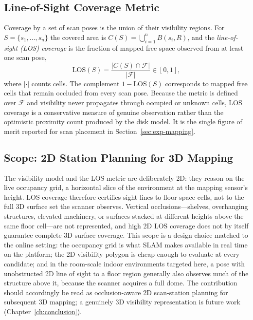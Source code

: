 \subsection{Line-of-Sight Coverage Metric}
\label{subsec:los}

Coverage by a set of scan poses is the union of their visibility regions. For
$S=\{s_1,\dots,s_n\}$ the covered area is $C(S)=\bigcup_{i=1}^{n} B(s_i,R)$,
and the \emph{line-of-sight (LOS) coverage} is the fraction of mapped free
space observed from at least one scan pose,
\begin{equation}
\mathrm{LOS}(S)=\frac{\lvert C(S)\cap\mathcal{F}\rvert}{\lvert\mathcal{F}\rvert}\in[0,1],
\label{eq:los}
\end{equation}
where $\lvert\cdot\rvert$ counts cells. The complement $1-\mathrm{LOS}(S)$
corresponds to mapped free cells that remain occluded from every scan pose.
Because the metric is defined over $\mathcal{F}$ and visibility never
propagates through occupied or unknown cells, LOS coverage is a conservative
measure of genuine observation rather than the optimistic proximity count
produced by the disk model. It is the single figure of merit reported for
scan placement in Section~\ref{sec:exp-mapping}.

\subsection{Scope: 2D Station Planning for 3D Mapping}
\label{subsec:scope2d}

The visibility model and the LOS metric are deliberately 2D: they
reason on the live occupancy grid, a horizontal slice of the environment at the
mapping sensor's height. LOS coverage therefore certifies sight lines to
floor-space cells, not to the full 3D surface set the scanner observes.
Vertical occlusions---shelves, overhanging structures, elevated machinery, or
surfaces stacked at different heights above the same floor cell---are not
represented, and high 2D LOS coverage does not by itself guarantee complete 3D
surface coverage. This scope is a design choice matched to the online setting:
the occupancy grid is what SLAM makes available in real time on the platform;
the 2D visibility polygon is cheap enough to evaluate at every candidate; and
in the room-scale indoor environments targeted here, a pose with unobstructed
2D line of sight to a floor region generally also observes much of the
structure above it, because the scanner acquires a full dome. The contribution
should accordingly be read as occlusion-aware 2D scan-station planning for
subsequent 3D mapping; a genuinely 3D visibility representation is future work
(Chapter~\ref{ch:conclusion}).

